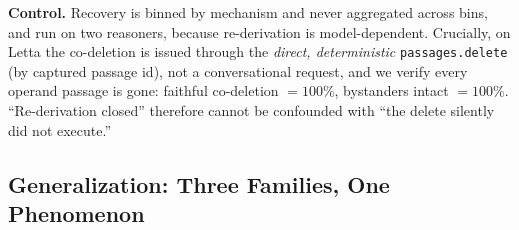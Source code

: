 \documentclass[10pt,twocolumn,letterpaper]{article}
\theoremstyle{definition}
\theoremstyle{plain}
\newcommand{\code}[1]{\texttt{#1}}
\begin{document}
\textbf{Control.} Recovery is binned by mechanism and never aggregated across bins,
and run on two reasoners, because re-derivation is model-dependent. Crucially, on
Letta the co-deletion is issued through the \emph{direct, deterministic}
\code{passages.delete} (by captured passage id), not a conversational request, and
we verify every operand passage is gone: faithful co-deletion $=100\%$, bystanders
intact $=100\%$. ``Re-derivation closed'' therefore cannot be confounded with ``the
delete silently did not execute.''

\subsection{Generalization: Three Families, One Phenomenon}
\label{sec:res-converge}
\end{document}
